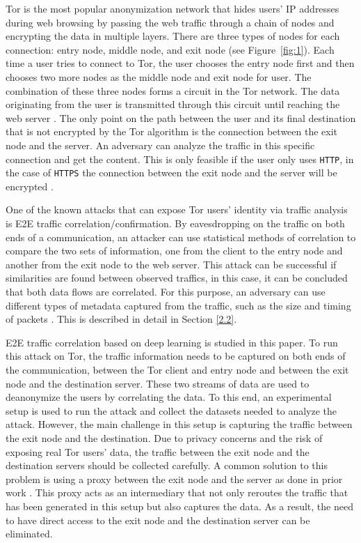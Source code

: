 \documentclass[sigconf]{acmart}
\begin{document}
Tor \cite{TheOnionRouter} is the most popular anonymization network that hides users’ IP addresses during web browsing by passing the web traffic through a chain of nodes and encrypting the data in multiple layers. There are three types of nodes for each connection: entry node, middle node, and exit node (see Figure~\ref{fig:1}). Each time a user tries to connect to Tor, the user chooses the entry node first and then chooses two more nodes as the middle node and exit node for user. The combination of these three nodes forms a circuit in the Tor network. The data originating from the user is transmitted through this circuit until reaching the web server \cite{privacyguides}. The only point on the path between the user and its final destination that is not encrypted by the Tor algorithm is the connection between the exit node and the server. An adversary can analyze the traffic in this specific connection and get the content. This is only feasible if the user only uses \texttt{HTTP}, in the case of \texttt{HTTPS} the connection between the exit node and the server will be encrypted \cite{Torprojecthttps}.

One of the known attacks that can expose Tor users' identity via traffic analysis is E2E traffic correlation/confirmation. By eavesdropping on the traffic on both ends of a communication, an attacker can use statistical methods of correlation to compare the two sets of information, one from the client to the entry node and another from the exit node to the web server. This attack can be successful if similarities are found between observed traffics, in this case, it can be concluded that both data flows are correlated. For this purpose, an adversary can use different types of metadata captured from the traffic, such as the size and timing of packets \cite{JanThesis}. This is described in detail in Section \ref{2.2}.

E2E traffic correlation based on deep learning is studied in this paper. To run this attack on Tor, the traffic information needs to be captured on both ends of the communication, between the Tor client and entry node and between the exit node and the destination server. These two streams of data are used to deanonymize the users by correlating the data. To this end, an experimental setup is used to run the attack and collect the datasets needed to analyze the attack. However, the main challenge in this setup is capturing the traffic between the exit node and the destination. Due to privacy concerns and the risk of exposing real Tor users' data, the traffic between the exit node and the destination servers should be collected carefully. A common solution to this problem is using a proxy between the exit node and the server as done in prior work \cite{nasr2018deepcorr}. This proxy acts as an intermediary that not only reroutes the traffic that has been generated in this setup but also captures the data. As a result, the need to have direct access to the exit node and the destination server can be eliminated. 
\end{document}
